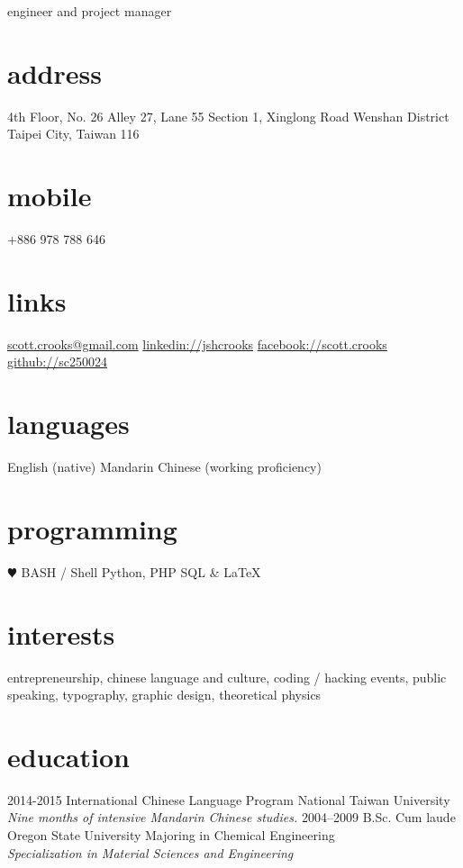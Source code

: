 \documentclass[]{friggeri-cv}
\begin{document}
       {engineer and project manager}


\begin{aside}
  \section{address}
    4th Floor, No. 26
    Alley 27, Lane 55
    Section 1, Xinglong Road
    Wenshan District
    Taipei City, Taiwan 116
  \section{mobile}
    +886 978 788 646
  \section{links}
    \href{mailto:scott.crooks@gmail.com}{scott.crooks@gmail.com}
    \href{http://linkedin.com/in/jshcrooks}{linkedin://jshcrooks}
    \href{http://facebook.com/scott.crooks}{facebook://scott.crooks}
    \href{http://github.com/sc250024}{github://sc250024}
  \section{languages}
    English (native)
    Mandarin Chinese (working proficiency)
  \section{programming}
    {\color{red} $\varheartsuit$} BASH / Shell
    Python, PHP
    SQL \& \LaTeX
\end{aside}

\section{interests}

entrepreneurship, chinese language and culture, coding / hacking events, public speaking, typography, graphic design, theoretical physics

\section{education}

\begin{entrylist}
  \entry
    {2014-2015}
    {International Chinese Language Program}
    {National Taiwan University}
    {\emph{Nine months of intensive Mandarin Chinese studies.}}
  \entry
    {2004–2009}
    {B.Sc. Cum laude}
    {Oregon State University}
    {Majoring in Chemical Engineering\\
    \emph{Specialization in Material Sciences and Engineering}}
\end{entrylist}
\end{document}
